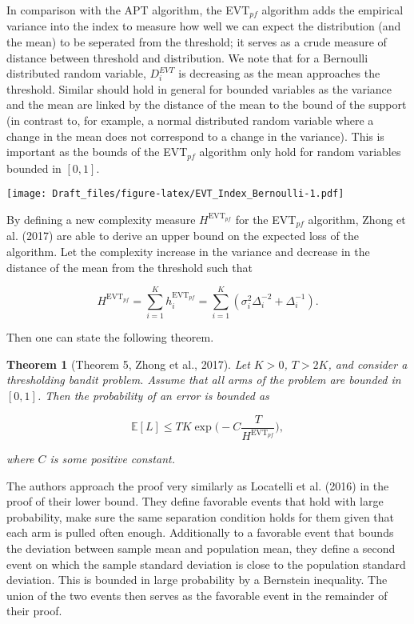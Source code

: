 \documentclass[12pt,]{article}
\newtheorem{theorem}{Theorem}
\begin{document}
In comparison with the APT algorithm, the EVT\(_{pf}\) algorithm adds
the empirical variance into the index to measure how well we can expect
the distribution (and the mean) to be seperated from the threshold; it
serves as a crude measure of distance between threshold and
distribution. We note that for a Bernoulli distributed random variable,
\(D_i^{EVT}\) is decreasing as the mean approaches the threshold.
Similar should hold in general for bounded variables as the variance and
the mean are linked by the distance of the mean to the bound of the
support (in contrast to, for example, a normal distributed random
variable where a change in the mean does not correspond to a change in
the variance). This is important as the bounds of the EVT\(_{pf}\)
algorithm only hold for random variables bounded in \([0,1]\).

\texttt{[image: Draft\_files/figure-latex/EVT\_Index\_Bernoulli-1.pdf]}

By defining a new complexity measure \(H^{\text{EVT}_{pf}}\) for the
EVT\(_{pf}\) algorithm, Zhong et al. (2017) are able to derive an upper
bound on the expected loss of the algorithm. Let the complexity increase
in the variance and decrease in the distance of the mean from the
threshold such that

\[
H^{\text{EVT}_{pf}} = \sum_{i=1}^K h_i^{\text{EVT}_{pf}} = \sum_{i=1}^K (\sigma_i^2\Delta_i^{-2} + \Delta_i^{-1}).
\]

Then one can state the following theorem.

\begin{theorem}[Theorem 5, Zhong et al., 2017] 
\label{theorem:ZhongEtAl2017Theorem5}
Let $K > 0$, $T > 2K$, and consider a thresholding bandit problem. Assume that all arms of the problem are bounded in $[0,1]$. Then the probability of an error is bounded as

\begin{equation*}
\mathbb{E}[L] \leq TK \exp\Big(-C\frac{T}{H^{\text{EVT}_{pf}}}\Big),
\end{equation*}

where $C$ is some positive constant.
\end{theorem}

The authors approach the proof very similarly as Locatelli et al. (2016)
in the proof of their lower bound. They define favorable events that
hold with large probability, make sure the same separation condition
holds for them given that each arm is pulled often enough. Additionally
to a favorable event that bounds the deviation between sample mean and
population mean, they define a second event on which the sample standard
deviation is close to the population standard deviation. This is bounded
in large probability by a Bernstein inequality. The union of the two
events then serves as the favorable event in the remainder of their
proof.
\end{document}
